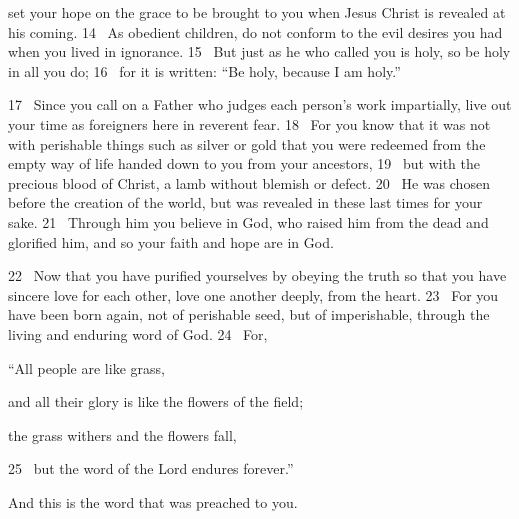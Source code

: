 set your hope
on the grace to be brought to you
when Jesus Christ is revealed at his coming.
14 
As obedient
children, do not conform
to the evil desires you had when you lived in ignorance.
15 
But just as he who called you is holy, so be holy in all you do;
16 
for it is written: “Be holy, because I am holy.”
\par
17 
Since you call on a Father
who judges each person’s work
impartially,
live out your time as foreigners
here in reverent fear.
18 
For you know that it was not with perishable things such as silver or gold that you were redeemed
from the empty way of life
handed down to you from your ancestors,
19 
but with the precious blood
of Christ, a lamb
without blemish or defect.
20 
He was chosen before the creation of the world,
but was revealed in these last times
for your sake.
21 
Through him you believe in God,
who raised him from the dead
and glorified him,
and so your faith and hope
are in God.
\par
22 
Now that you have purified
yourselves by obeying
the truth so that you have sincere love for each other, love one another deeply,
from the heart.
23 
For you have been born again,
not of perishable seed, but of imperishable,
through the living and enduring word of God.
24 
For,
\par
“All people are like grass,
\par
and all their glory is like the flowers of the field;
\par
the grass withers and the flowers fall,
\par
25 
but the word of the Lord endures forever.”
\par
And this is the word that was preached to you.


\bye


